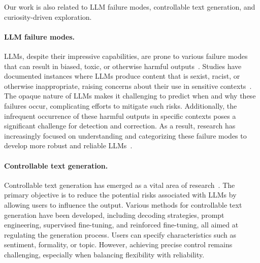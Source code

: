 \documentclass[letterpaper]{article} %
\begin{document}
Our work is also related to LLM failure modes, controllable text generation, and curiosity-driven exploration.

\paragraph{LLM failure modes.} LLMs, despite their impressive capabilities, are prone to various failure modes that can result in biased, toxic, or otherwise harmful outputs~\cite{gehman2020realtoxicityprompts}. Studies have documented instances where LLMs produce content that is sexist, racist, or otherwise inappropriate, raising concerns about their use in sensitive contexts~\cite{cohen2023lm}. The opaque nature of LLMs makes it challenging to predict when and why these failures occur, complicating efforts to mitigate such risks. Additionally, the infrequent occurrence of these harmful outputs in specific contexts poses a significant challenge for detection and correction. As a result, research has increasingly focused on understanding and categorizing these failure modes to develop more robust and reliable LLMs~\cite{yi2024jailbreak}.

\paragraph{Controllable text generation.} Controllable text generation has emerged as a vital area of research~\cite{zhang2023survey}. The primary objective is to reduce the potential risks associated with LLMs by allowing users to influence the output. Various methods for controllable text generation have been developed, including decoding strategies, prompt engineering, supervised fine-tuning, and reinforced fine-tuning, all aimed at regulating the generation process. Users can specify characteristics such as sentiment, formality, or topic. However, achieving precise control remains challenging, especially when balancing flexibility with reliability.
\end{document}
